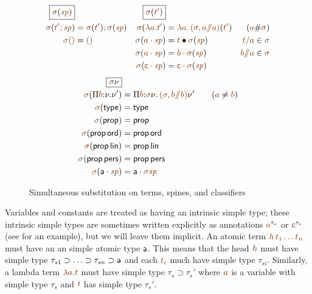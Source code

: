 \begin{figure}
\begin{align*}
\fbox{$\lf{\sigma}(\lf{\spi})$}&
&
\fbox{$\lf{\sigma}(\lf{t'})$}
\\
\lf{\sigma}(\lf{t'; \spi}) 
 & = \lf{\no{\lf{\sigma}(\lf{t'})}; \no{\lf{\sigma}(\lf{\spi})}} &
\lf{\sigma}(\lf{\lambda a.t'}) 
 & = \lf{\lambda a.\,\no{\lf{(\sigma, a/\!\!/a)}(\lf{t'})}}
 & (\lf{a} \# \lf{\sigma})
\\
\lf{\sigma}\lfnil 
 & = \lfnil &
\lf{\sigma}(\lf{\lfroot{a}{\spi}}) 
 & = \subst{\lf t}{\no{\lf{\sigma}(\lf{\spi})}}
      & \lf{t/a} \in \lf{\sigma} 
\\
& &
\lf{\sigma}(\lf{\lfroot{a}{\spi}}) 
 & = \lf{\lfroot{b}{\no{\lf{\sigma}(\lf{\spi})}}} 
      & \lf{b/\!\!/a} \in \lf{\sigma} 
\\
& &
\lf{\sigma}(\lf{\lfroot{\sf c}{\spi}}) 
 & = \lf{\lfroot{\sf c}{\no{\lf{\sigma}(\lf{\spi})}}} 
\end{align*}\begin{align*}
\fbox{$\lf{\sigma}{\nu}$} &
\\
\lf{\sigma}(\lfpi{b}{\nu}{\nu'})
 & = \lfpi{b}{\lf{\sigma}\nu}{\,\lf{(\sigma, b/\!\!/b)}\nu'}
     \qquad (\lf a \neq \lf b) 
\\
\lf{\sigma}({\sf type})
  & = {\sf type}
\\ 
\lf{\sigma}({\sf prop}) 
 & = {\sf prop} 
\\
\lf{\sigma}({\sf prop}\,{\sf ord}) 
 & = {\sf prop}\,{\sf ord} 
\\
\lf{\sigma}({\sf prop}\,{\sf lin}) 
 & = {\sf prop}\,{\sf lin} 
\\
\lf{\sigma}({\sf prop}\,{\sf pers}) 
 & = {\sf prop}\,{\sf pers} 
\\
\lf{\sigma}(\lfroot{\sf a}{\spi}) 
 & = \lfroot{\sf a}{{\lf{\sigma\spi}}}
\end{align*}
\caption{Simultaneous substitution on terms, spines, and classifiers}
\label{fig:simsubst}
\end{figure}

Variables and constants are treated as having an intrinsic simple
type; these intrinsic simple types are sometimes written explicitly as
annotations $\lf{a}^{\tau_s}$ or $\lf{\sf c}^{\tau_s}$ (see
\cite{pfenning08church} for an example), but we will leave them
implicit.  An atomic term $\lf{h\,t_1\ldots t_n}$ must have an an
simple atomic type ${\sf a}$. This means that the head $\lf h$ must
have simple type $\tau_{s1} \supset \ldots \supset \tau_{sn} \supset
{\sf a}$ and each $\lf{t_i}$ much have simple type
$\tau_{si}$. Similarly, a lambda term $\lf{\lambda a. t}$ must have
simple type $\tau_s \supset \tau_s'$ where $\lf a$ is a variable with
simple type $\tau_s$ and $\lf t$ has simple type $\tau_s'$.

